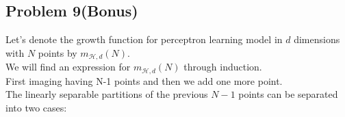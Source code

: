 \documentclass[12pt, a4paper]{article}
\begin{document}
\begin{CJK}{UTF8}{bkai}
	\fontsize{12pt}{15pt} \selectfont
	\section*{Problem 9(Bonus)}
		Let's denote the growth function for perceptron learning model in $d$ dimensions with $N$ points by $m_{\mathcal{H}, d}(N)$. \\
		We will find an expression for $m_{\mathcal{H}, d}(N)$ through induction. \\
		First imaging having N-1 points and then we add one more point. \\
		The linearly separable partitions of the previous $N-1$ points can be separated into two cases:

\end{CJK}
\end{document}
